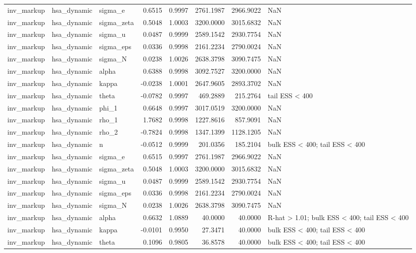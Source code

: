 \begin{tabular}{lllrrrrl}
inv\_markup & hsa\_dynamic & sigma\_e & 0.6515 & 0.9997 & 2761.1987 & 2966.9022 & NaN \\
inv\_markup & hsa\_dynamic & sigma\_zeta & 0.5048 & 1.0003 & 3200.0000 & 3015.6832 & NaN \\
inv\_markup & hsa\_dynamic & sigma\_u & 0.0487 & 0.9999 & 2589.1542 & 2930.7754 & NaN \\
inv\_markup & hsa\_dynamic & sigma\_eps & 0.0336 & 0.9998 & 2161.2234 & 2790.0024 & NaN \\
inv\_markup & hsa\_dynamic & sigma\_N & 0.0238 & 1.0026 & 2638.3798 & 3090.7475 & NaN \\
inv\_markup & hsa\_dynamic & alpha & 0.6388 & 0.9998 & 3092.7527 & 3200.0000 & NaN \\
inv\_markup & hsa\_dynamic & kappa & -0.0238 & 1.0001 & 2647.9605 & 2893.3702 & NaN \\
inv\_markup & hsa\_dynamic & theta & -0.0782 & 0.9997 & 469.2889 & 215.2764 & tail ESS < 400 \\
inv\_markup & hsa\_dynamic & phi\_1 & 0.6648 & 0.9997 & 3017.0519 & 3200.0000 & NaN \\
inv\_markup & hsa\_dynamic & rho\_1 & 1.7682 & 0.9998 & 1227.8616 & 857.9091 & NaN \\
inv\_markup & hsa\_dynamic & rho\_2 & -0.7824 & 0.9998 & 1347.1399 & 1128.1205 & NaN \\
inv\_markup & hsa\_dynamic & n & -0.0512 & 0.9999 & 201.0356 & 185.2104 & bulk ESS < 400; tail ESS < 400 \\
inv\_markup & hsa\_dynamic & sigma\_e & 0.6515 & 0.9997 & 2761.1987 & 2966.9022 & NaN \\
inv\_markup & hsa\_dynamic & sigma\_zeta & 0.5048 & 1.0003 & 3200.0000 & 3015.6832 & NaN \\
inv\_markup & hsa\_dynamic & sigma\_u & 0.0487 & 0.9999 & 2589.1542 & 2930.7754 & NaN \\
inv\_markup & hsa\_dynamic & sigma\_eps & 0.0336 & 0.9998 & 2161.2234 & 2790.0024 & NaN \\
inv\_markup & hsa\_dynamic & sigma\_N & 0.0238 & 1.0026 & 2638.3798 & 3090.7475 & NaN \\
inv\_markup & hsa\_dynamic & alpha & 0.6632 & 1.0889 & 40.0000 & 40.0000 & R-hat > 1.01; bulk ESS < 400; tail ESS < 400 \\
inv\_markup & hsa\_dynamic & kappa & -0.0101 & 0.9950 & 27.3471 & 40.0000 & bulk ESS < 400; tail ESS < 400 \\
inv\_markup & hsa\_dynamic & theta & 0.1096 & 0.9805 & 36.8578 & 40.0000 & bulk ESS < 400; tail ESS < 400 \\

\end{tabular}
